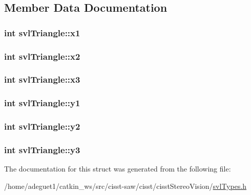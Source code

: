 \subsection{Member Data Documentation}
\hypertarget{structsvl_triangle_aadd880d75747824dc68592b008cc622f}{
\subsubsection[{x1}]{\setlength{\rightskip}{0pt plus 5cm}int svl\-Triangle\-::x1}}\label{structsvl_triangle_aadd880d75747824dc68592b008cc622f}
\hypertarget{structsvl_triangle_a0d54bb4e6b2a9a776c7934f98ab615f2}{
\subsubsection[{x2}]{\setlength{\rightskip}{0pt plus 5cm}int svl\-Triangle\-::x2}}\label{structsvl_triangle_a0d54bb4e6b2a9a776c7934f98ab615f2}
\hypertarget{structsvl_triangle_a55e31484afa1dd95b65fed71acd32798}{
\subsubsection[{x3}]{\setlength{\rightskip}{0pt plus 5cm}int svl\-Triangle\-::x3}}\label{structsvl_triangle_a55e31484afa1dd95b65fed71acd32798}
\hypertarget{structsvl_triangle_a8d2d2e3a7518fbe2dd54ae83295a5564}{
\subsubsection[{y1}]{\setlength{\rightskip}{0pt plus 5cm}int svl\-Triangle\-::y1}}\label{structsvl_triangle_a8d2d2e3a7518fbe2dd54ae83295a5564}
\hypertarget{structsvl_triangle_a5b846c983e7fb8778b41310ecccb31d6}{
\subsubsection[{y2}]{\setlength{\rightskip}{0pt plus 5cm}int svl\-Triangle\-::y2}}\label{structsvl_triangle_a5b846c983e7fb8778b41310ecccb31d6}
\hypertarget{structsvl_triangle_ac077e0223f63837cc3d6013935141db6}{
\subsubsection[{y3}]{\setlength{\rightskip}{0pt plus 5cm}int svl\-Triangle\-::y3}}\label{structsvl_triangle_ac077e0223f63837cc3d6013935141db6}


The documentation for this struct was generated from the following file\-:\begin{DoxyCompactItemize}
\item 
/home/adeguet1/catkin\-\_\-ws/src/cisst-\/saw/cisst/cisst\-Stereo\-Vision/\hyperlink{svl_types_8h}{svl\-Types.\-h}\end{DoxyCompactItemize}
